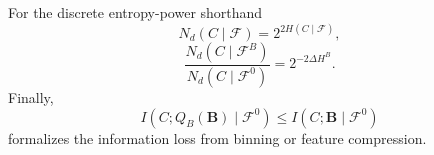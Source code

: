 For the discrete entropy-power shorthand
\begin{equation}
N_d(C\mid\mathcal F)=2^{2H(C\mid\mathcal F)},
\label{eq:discrete_entropy_power}
\end{equation}
\begin{equation}
\frac{N_d(C\mid\mathcal F^B)}
{N_d(C\mid\mathcal F^0)}
=2^{-2\Delta H^B}.
\label{eq:cmi_entropy_power_ratio}
\end{equation}
Finally,
\begin{equation}
I(C;Q_B(\mathbf B)\mid\mathcal F^0)
\leq I(C;\mathbf B\mid\mathcal F^0)
\label{eq:bicycle_data_processing}
\end{equation}
formalizes the information loss from binning or feature compression.
